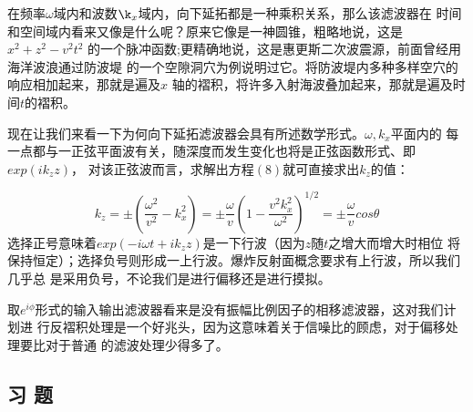 在频率$\omega$域内和波数$\k_{x}$域内，向下延拓都是一种乘积关系，那么该滤波器在
时间和空间域内看来又像是什么呢？原来它像是一神圆锥，粗略地说，这是$x^{2}+z^{2}-v^{2}t^{2}$
的一个脉冲函数;更精确地说，这是惠更斯二次波震源，前面曾经用海洋波浪通过防波堤
的一个空隙洞穴为例说明过它。将防波堤内多种多样空穴的响应相加起来，那就是遍及$x$
轴的褶积，将许多入射海波叠加起来，那就是遍及时间$t$的褶积。

现在让我们来看一下为何向下延拓滤波器会具有所述数学形式。$\omega,k_{x}$平面内的
每一点都与一正弦平面波有关，随深度而发生变化也将是正弦函数形式、即$exp(ik_{z}z)$，
对该正弦波而言，求解出方程$(8)$就可直接求出$k_{z}$的值：

\begin{subequations}\label{eq:ex1.2.11}
\begin{equation}
k_{z}=\pm(\frac{\omega^2}{v^2}-k_{x}^{2})　\label{eq:ex1.2.11a}
\end{equation}
\begin{equation}
 =\pm \frac{\omega}{v}(1-\frac{v^2k_{x}^{2}}{\omega^{2}})^{1/2} \label{eq:ex1.2.11b}
\end{equation}
\begin{equation}
 =\pm \frac{\omega}{v}cos\theta \label{eq:ex1.2.11c}
\end{equation}
\end{subequations}
选择正号意味着$exp(-i\omega t+ik_{z}z)$是一下行波（因为$z$随$t$之增大而增大时相位
将保持恒定）；选择负号则形成一上行波。爆炸反射面概念要求有上行波，所以我们几乎总
是采用负号，不论我们是进行偏移还是进行摸拟。

取$e^{i\phi}$形式的输入输出滤波器看来是没有振幅比例因子的相移滤波器，这对我们计划进
行反褶积处理是一个好兆头，因为这意味着关于信噪比的顾虑，对于偏移处理要比对于普通
的滤波处理少得多了。

\subsection{习 题}
\label{sec:1.2.6}


